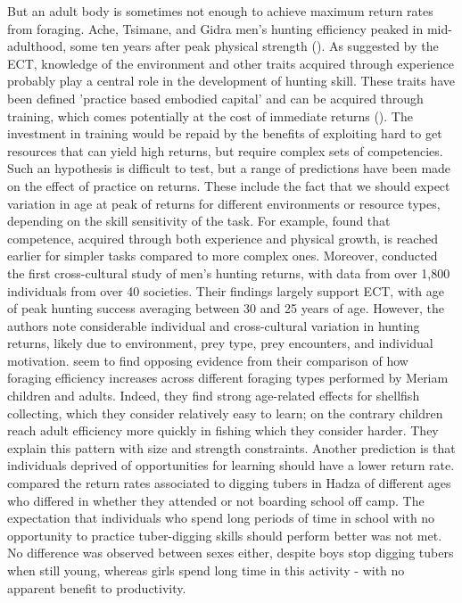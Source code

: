  
But an adult body is sometimes not enough to achieve maximum return rates from foraging. Ache, Tsimane, and Gidra men’s hunting efficiency peaked in mid-adulthood, some ten years after peak physical strength (\cite{walker_age-dependency_2002, gurven_how_2006, ohtsuka_hunting_1989}). As suggested by the ECT,  knowledge of the environment and other traits acquired through experience probably play a central role in the development of hunting skill. These traits have been defined 'practice based embodied capital' and can be acquired through training, which comes potentially at the cost of immediate returns (\cite{bock_evolutionary_2002}). The investment in training would be repaid by the benefits of exploiting hard to get resources that can yield high returns, but require complex sets of competencies. Such an hypothesis is difficult to test, but a range of predictions have been made on the effect of practice on returns. These include the fact that we should expect variation in age at peak of returns for different environments or resource types, depending on the skill sensitivity of the task. For example, \cite{bock_learning_2002} found that competence, acquired through both experience and physical growth, is reached earlier for simpler tasks compared to more complex ones. Moreover, \cite{koster_life_2020} conducted the first cross-cultural study of men’s hunting returns, with data from over 1,800 individuals from over 40 societies. Their findings largely support ECT, with age of peak hunting success averaging between 30 and 25 years of age. However, the authors note considerable individual and cross-cultural variation in hunting returns, likely due to environment, prey type, prey encounters, and individual motivation.
\cite{bird_constraints_2002} seem to find opposing evidence from their comparison of how foraging efficiency increases across different foraging types performed by Meriam children and adults. Indeed, they find strong age-related effects for shellfish collecting, which they consider relatively easy to learn; on the contrary children reach adult efficiency more quickly in fishing which they consider harder. They explain this pattern with size and strength constraints.
Another prediction is that individuals deprived of opportunities for learning should have a lower return rate. \cite{blurton_jones_selection_2002} compared the return rates associated to digging tubers in Hadza of different ages who differed in whether they attended or not boarding school off camp. The expectation that individuals who spend long periods of time in school with no opportunity to practice tuber-digging skills should perform better was not met. No difference was observed between sexes either, despite boys stop digging tubers when still young, whereas girls spend long time in this activity - with no apparent benefit to productivity. 

